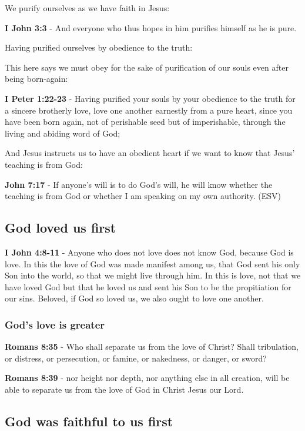 \documentclass[11pt]{article}
\begin{document}
We purify ourselves as we have faith in Jesus:

\textbf{I John 3:3} - And everyone who thus hopes in him purifies himself as he is pure.

Having purified ourselves by obedience to the truth:

This here says we must obey for the sake of purification of our souls even after being born-again:

\textbf{I Peter 1:22-23} - Having purified your souls by your obedience to the truth for a sincere brotherly love, love one another earnestly from a pure heart, since you have been born again, not of perishable seed but of imperishable, through the living and abiding word of God;

And Jesus instructs us to have an obedient heart if we want to know that Jesus' teaching is from God:

\textbf{John 7:17} - If anyone's will is to do God's will, he will know whether the teaching is from God or whether I am speaking on my own authority.  (ESV)

\subsection{God loved us first}
\label{sec:orga297071}
\textbf{I John 4:8-11} - Anyone who does not love does not know God, because God is love. In this the love of God was made manifest among us, that God sent his only Son into the world, so that we might live through him. In this is love, not that we have loved God but that he loved us and sent his Son to be the propitiation for our sins. Beloved, if God so loved us, we also ought to love one another.

\subsubsection{God's love is greater}
\label{sec:orgc783ed1}
\textbf{Romans 8:35} - Who shall separate us from the love of Christ? Shall tribulation, or distress, or persecution, or famine, or nakedness, or danger, or sword?

\textbf{Romans 8:39} - nor height nor depth, nor anything else in all creation, will be able to separate us from the love of God in Christ Jesus our Lord.

\subsection{God was faithful to us first}
\label{sec:org69730ff}
\end{document}
